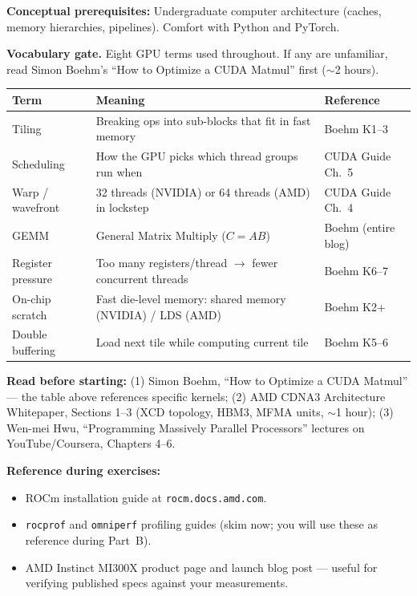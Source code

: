 \textbf{Conceptual prerequisites:} Undergraduate computer architecture (caches, memory hierarchies, pipelines). Comfort with Python and PyTorch.

\textbf{Vocabulary gate.} Eight GPU terms used throughout. If any are unfamiliar, read Simon Boehm's ``How to Optimize a CUDA Matmul'' first ($\sim$2 hours).

\begin{center}
\small
\begin{tabular}{@{}lp{7.5cm}l@{}}
\toprule
\textbf{Term} & \textbf{Meaning} & \textbf{Reference} \\
\midrule
Tiling & Breaking ops into sub-blocks that fit in fast memory & Boehm K1--3 \\
Scheduling & How the GPU picks which thread groups run when & CUDA Guide Ch.~5 \\
Warp / wavefront & 32 threads (NVIDIA) or 64 threads (AMD) in lockstep & CUDA Guide Ch.~4 \\
GEMM & General Matrix Multiply ($C = AB$) & Boehm (entire blog) \\
Register pressure & Too many registers/thread $\to$ fewer concurrent threads & Boehm K6--7 \\
On-chip scratch & Fast die-level memory: shared memory (NVIDIA) / LDS (AMD) & Boehm K2+ \\
Double buffering & Load next tile while computing current tile & Boehm K5--6 \\
\bottomrule
\end{tabular}
\end{center}

\textbf{Read before starting:} (1) Simon Boehm, ``How to Optimize a CUDA Matmul'' --- the table above references specific kernels; (2) AMD CDNA3 Architecture Whitepaper, Sections 1--3 (XCD topology, HBM3, MFMA units, $\sim$1 hour); (3) Wen-mei Hwu, ``Programming Massively Parallel Processors'' lectures on YouTube/Coursera, Chapters 4--6.

\textbf{Reference during exercises:}
\begin{itemize}
  \item ROCm installation guide at \texttt{rocm.docs.amd.com}.
  \item \texttt{rocprof} and \texttt{omniperf} profiling guides (skim now; you will use these as reference during Part~B).
  \item AMD Instinct MI300X product page and launch blog post --- useful for verifying published specs against your measurements.
\end{itemize}

